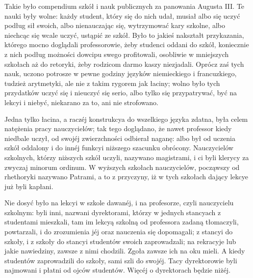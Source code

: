 \documentclass{book}
\begin{document}
Takie było compendium szkół i nauk publicznych za panowania Augusta III. Te nauki były wolne: każdy student, który się do nich udał, musiał albo się uczyć podług sił swoich, albo nienauczając się, wytrzymować kary szkolne, albo niechcąc się wcale uczyć, ustąpić ze szkół. Było to jakieś nakształt przykazania, którego mocno doglądali professorowie, żeby studenci oddani do szkół, koniecznie z nich podług możności dowcipu swego profitowali, osobliwie w mniejszych szkołach aż do retoryki, żeby rodzicom darmo kaszy niezjadali. Oprócz zaś tych nauk, uczono potrosze w pewne godziny języków niemieckiego i francuzkiego, tudzież arytmetyki, ale nie z takim rygorem jak łaciny; wolno było tych przydatków uczyć się i nieuczyć się serio, albo tylko się przypatrywać, być na lekcyi i niebyć, niekarano za to, ani nie strofowano.

Jedna tylko łacina, a raczéj konstrukcya do wszelkiego języka zdatna, była celem natężenia pracy nauczycielów; tak tego doglądano, że nawet professor kiedy niedbale uczył, od swojéj zwierzchności odbierał naganę: albo był od uczenia szkół oddalony i do innéj funkcyi niższego szacunku obrócony. Nauczycielów szkolnych, którzy niższych szkół uczyli, nazywano magistrami, i ci byli klerycy za zwyczaj minorum ordinum. W wyższych szkołach nauczycielów, począwszy od rhethoryki nazywano Patrami, a to z przyczyny, iż w tych szkołach dający lekcye już byli kapłani.

Nie dosyć było na lekcyi w szkole dawanéj, i na profesorze, czyli nauczycielu szkolnym: byli inni, nazwani dyrektorami, którzy w jednych stancyach z studentami mieszkali, tam im lekcyą szkolną od professora zadaną tłomaczyli, powtarzali, i do zrozumienia jéj oraz nauczenia się dopomagali; z stancyi do szkoły, i z szkoły do stancyi studentów swoich zaprowadzali; na rekracyje lub jakie nawiedziny, zawsze z nimi chodzili. Zgoła zawsze ich na oku mieli. A kiedy studentów zaprowadzili do szkoły, sami szli do swojéj. Tacy dyrektorowie byli najmowani i płatni od ojców studentów. Więcéj o dyrektorach będzie niżéj.
\end{document}
